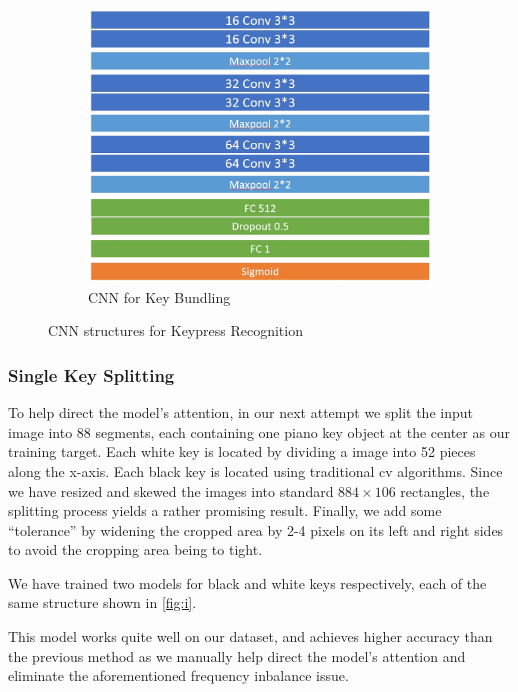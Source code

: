 \documentclass[10pt,twocolumn,letterpaper]{article}
\begin{document}
\begin{figure}[h!]
\begin{subfigure}{0.4\textwidth}
         \includegraphics[width=\linewidth]{fig/12.png}
         \caption{CNN for Key Bundling} \label{fig:j}
       \end{subfigure}
      \caption{CNN structures for Keypress Recognition} \label{fig:3}
   \end{figure}

\subsubsection{Single Key Splitting}

To help direct the model's attention, in our next attempt we split the input image into 88 segments, 
each containing one piano key object at the center as our training target. 
Each white key is located by dividing a image into 52 pieces along the x-axis. 
Each black key is located using traditional cv algorithms. 
Since we have resized and skewed the images into standard \(884 \times 106\) rectangles, the splitting process yields a rather promising result. 
Finally, we add some ``tolerance'' by widening the cropped area by 2-4 pixels on its left and right sides to avoid the cropping area being to tight. 

We have trained two models for black and white keys respectively, each of the same structure shown in \ref{fig:i}.

This model works quite well on our dataset, and achieves higher accuracy than the previous method as we manually help direct the model's attention and eliminate the aforementioned frequency inbalance issue.
\end{document}
